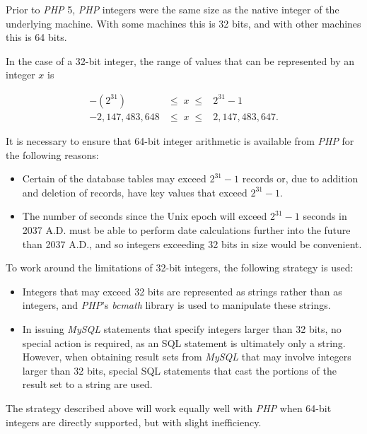 Prior to \emph{PHP} 5, \emph{PHP} integers were the same size as the native
integer of the underlying machine.  With some machines this is 32 bits, and with
other machines this is 64 bits.

In the case of a 32-bit integer, the range of values that can be represented
by an integer $x$ is

\begin{eqnarray}
-(2^{31})      & \leq \; x \; \leq & 2^{31} - 1\\
\nonumber -2,147,483,648 & \leq \; x \; \leq & 2,147,483,647 .
\end{eqnarray}

It is necessary to ensure that 64-bit integer arithmetic is available from 
\emph{PHP} for the following reasons:

\begin{itemize}
\item Certain of the database tables may exceed $2^{31}-1$ records or,
      due to addition and deletion of records, have key values that
      exceed $2^{31}-1$.
\item The number of seconds since the Unix epoch will exceed $2^{31}-1$ seconds
      in 2037 A.D\@.  \emph{\productbasename{}} must be able to perform
      date calculations further into the future than 2037 A.D., and so
      integers exceeding 32 bits in size would be convenient. 
\end{itemize}

To work around the limitations of 32-bit integers, the following strategy
is used:

\begin{itemize}
\item Integers that may exceed 32 bits are represented as strings rather than
      as integers, and \emph{PHP}'s \emph{bcmath} library is used to manipulate
      these strings.
\item In issuing \emph{MySQL} statements that specify integers larger than 32 bits,
      no special action is required, as an SQL statement is ultimately only a string.
      However, when obtaining result sets from \emph{MySQL} that may involve
      integers larger than 32 bits, special SQL statements that cast the portions of
      the result set to a string are used.
\end{itemize}

The strategy described above will work equally well with \emph{PHP} when 
64-bit integers are directly supported, but with slight inefficiency.


